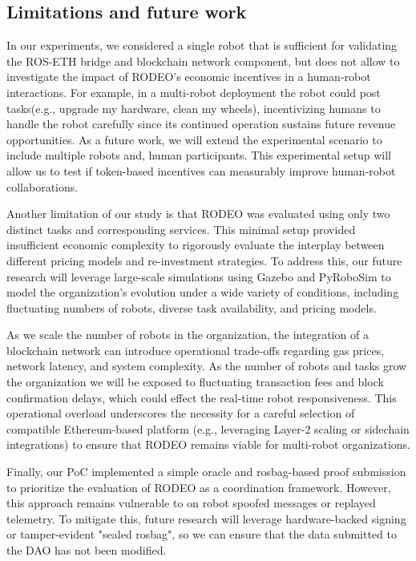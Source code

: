 \documentclass[letterpaper, 10 pt, conference]{ieeeconf}  %
\begin{document}
\subsection{Limitations and future work}
In our experiments, we considered a single robot that is sufficient for validating the ROS-ETH bridge and blockchain network component, but does not allow to investigate the impact of RODEO's economic incentives in a human-robot interactions. For example, in a multi-robot deployment the robot could post tasks(e.g., upgrade my hardware, clean my wheels), incentivizing humans to handle the robot carefully since its continued operation sustains future revenue opportunities. As a future work, we will extend the experimental scenario to include multiple robots and, human participants. This experimental setup will allow us to test if token-based incentives can measurably improve human-robot collaborations.

Another limitation of our study is that RODEO was evaluated using only two distinct tasks and corresponding services. This minimal setup provided insufficient economic complexity to rigorously evaluate the interplay between different pricing models and re-investment strategies. To address this, our future research will leverage large-scale simulations using Gazebo and PyRoboSim to model the organization's evolution under a wide variety of conditions, including fluctuating numbers of robots, diverse task availability, and pricing models. 

As we scale the number of robots in the organization, the integration of a blockchain network can introduce operational trade-offs regarding gas prices, network latency, and system complexity. As the number of robots and tasks grow the organization we will be exposed to fluctuating transaction fees and block confirmation delays, which could effect the real-time robot responsiveness. This operational overload underscores the necessity for a careful selection of compatible Ethereum-based platform (e.g., leveraging Layer-2 scaling or sidechain integrations) to ensure that RODEO remains viable for multi-robot organizations.

Finally, our PoC implemented a simple oracle and rosbag-based proof submission to prioritize the evaluation of RODEO as a coordination framework. However, this approach remains vulnerable to on robot spoofed messages or replayed telemetry. To mitigate this, future research will leverage hardware-backed signing or tamper-evident "sealed rosbag", so we can ensure that the data submitted to the DAO has not been modified.
\end{document}
